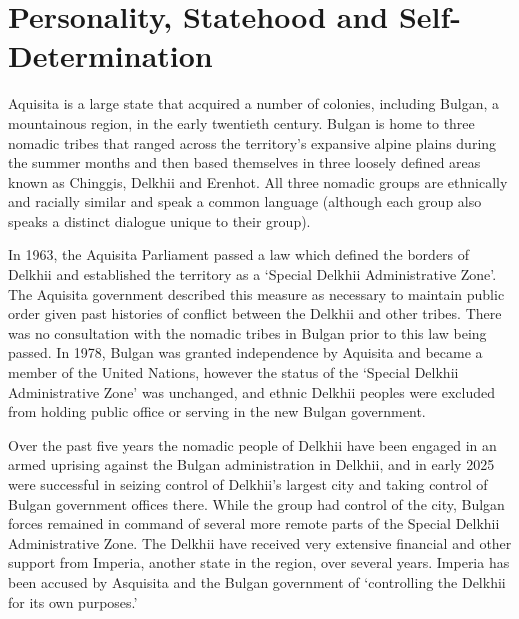 \section{Personality, Statehood and Self-Determination}
\begin{tutorialquestion}
    \flushleft
    
    Aquisita is a large state that acquired a number of colonies, including Bulgan, a mountainous
    region, in the early twentieth century. Bulgan is home to three nomadic tribes that ranged
    across the territory's expansive alpine plains during the summer months and then based
    themselves in three loosely defined areas known as Chinggis, Delkhii and Erenhot. All three
    nomadic groups are ethnically and racially similar and speak a common language (although
    each group also speaks a distinct dialogue unique to their group).

    \vspace{\baselineskip}

    In 1963, the Aquisita Parliament passed a law which defined the borders of Delkhii and
    established the territory as a `Special Delkhii Administrative Zone'. The Aquisita government
    described this measure as necessary to maintain public order given past histories of conflict
    between the Delkhii and other tribes. There was no consultation with the nomadic tribes in
    Bulgan prior to this law being passed. In 1978, Bulgan was granted independence by Aquisita
    and became a member of the United Nations, however the status of the `Special Delkhii
    Administrative Zone' was unchanged, and ethnic Delkhii peoples were excluded from holding
    public office or serving in the new Bulgan government.

    \vspace{\baselineskip}

    Over the past five years the nomadic people of Delkhii have been engaged in an armed
    uprising against the Bulgan administration in Delkhii, and in early 2025 were successful in
    seizing control of Delkhii's largest city and taking control of Bulgan government offices there.
    While the group had control of the city, Bulgan forces remained in command of several more
    remote parts of the Special Delkhii Administrative Zone. The Delkhii have received very
    extensive financial and other support from Imperia, another state in the region, over several
    years. Imperia has been accused by Asquisita and the Bulgan government of `controlling the
    Delkhii for its own purposes.'


\end{tutorialquestion}
